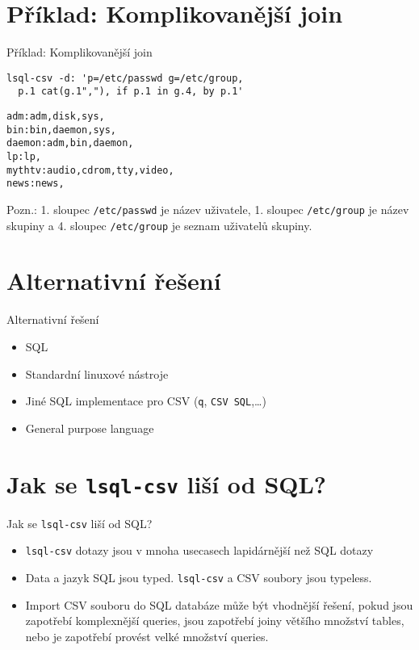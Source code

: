 \documentclass{beamer}
\def\icode#1{\texttt{#1}}
\begin{document}
\section{Příklad: Komplikovanější join}
\begin{frame}[fragile]{Příklad: Komplikovanější join}
\begin{verbatim}
lsql-csv -d: 'p=/etc/passwd g=/etc/group, 
  p.1 cat(g.1","), if p.1 in g.4, by p.1'
\end{verbatim}

\begin{verbatim}
adm:adm,disk,sys,
bin:bin,daemon,sys,
daemon:adm,bin,daemon,
lp:lp,
mythtv:audio,cdrom,tty,video,
news:news,
\end{verbatim}

\vskip 1cm

Pozn.: 1. sloupec \icode{/etc/passwd} je název uživatele, 1. sloupec \icode{/etc/group} je název skupiny a 
4. sloupec \icode{/etc/group} je seznam uživatelů skupiny.

\end{frame}

\section{Alternativní řešení}
\begin{frame}[fragile]{Alternativní řešení}
\begin{itemize}
\item SQL
\item Standardní linuxové nástroje
\item Jiné SQL implementace pro CSV (\icode{q}, \icode{CSV SQL},\ldots)
\item General purpose language
\end{itemize}
\end{frame}
		

\section{Jak se \icode{lsql-csv} liší od SQL?}
\begin{frame}[fragile]{Jak se \icode{lsql-csv} liší od SQL?}
\begin{itemize}
\item \icode{lsql-csv} dotazy jsou v mnoha usecasech lapidárnější než SQL dotazy
\item Data a jazyk SQL jsou typed. \icode{lsql-csv} a CSV soubory jsou typeless.
\item Import CSV souboru do SQL databáze může být vhodnější řešení, 
  pokud jsou zapotřebí komplexnější queries, jsou zapotřebí joiny většího množství tables, 
  nebo je zapotřebí provést velké množství queries.
\end{itemize}
\end{frame}
\end{document}
